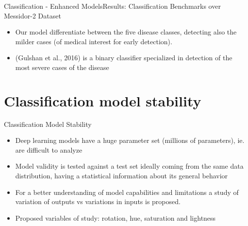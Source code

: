 \documentclass{beamer}
\begin{document}
\begin{frame}{Classification - Enhanced Models}{Results: Classification Benchmarks over Messidor-2 Dataset}	


\begin{table}[ht]
	\centering
	\caption{Prediction performance \& model complexity comparison of our proposal vs the state-of-the-art model (Messidor-2 data set)}
	\label{class2:tab:bench} 
\end{table}
\begin{itemize}
	\item Our model differentiate between the five disease classes, detecting also the milder cases (of medical interest for early detection).
	\item (Gulshan et al., 2016) is a binary classifier specialized in detection of the most severe cases of the disease
\end{itemize}
\end{frame}

\section{Classification model stability}

\begin{frame}{Classification Model Stability}{}	

\begin{itemize}
	\item Deep learning models have a huge parameter set (millions of parameters), ie. are difficult to analyze
	\item Model validity is tested against a test set ideally coming from the same data distribution, having a statistical information about its general behavior
	\item For a better understanding of model capabilities and limitations a study of variation of outputs vs variations in inputs is proposed.
	\item Proposed variables of study: rotation, hue, saturation and lightness
\end{itemize}
\end{frame}
\end{document}
